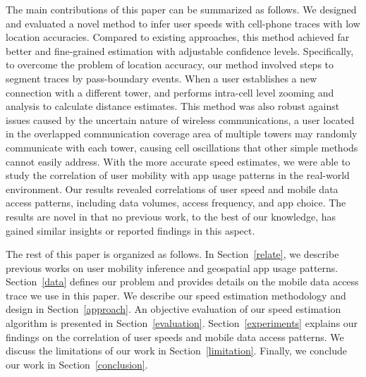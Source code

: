The main contributions of this paper can be summarized as follows.
We designed and evaluated a novel method to infer user speeds with cell-phone traces with low location accuracies. Compared to existing approaches, this method achieved far better and fine-grained estimation with adjustable confidence levels. Specifically, to overcome the problem of location accuracy, our method involved steps to segment traces by pass-boundary events. When a user establishes a new connection with a different tower, and performs intra-cell level zooming and analysis to calculate distance estimates. This method was also robust against issues caused by the uncertain nature of wireless communications, \eg a user located in the overlapped communication coverage area of multiple towers may randomly communicate with each tower, causing cell oscillations that other simple methods cannot easily address.
With the more accurate speed estimates, we were able to study the correlation of user mobility with app usage patterns in the real-world environment. 
Our results revealed correlations of user speed and mobile data access patterns, including data volumes, access frequency, 
and app choice. 
The results are novel in that no previous work, to the best of our knowledge, has gained similar insights or reported findings in this aspect.

The rest of this paper is organized as follows.
In Section~\ref{relate}, we describe previous works on user mobility inference and geospatial app usage patterns.
Section~\ref{data} defines our problem and provides details on the mobile data access trace we use in this paper.
We describe our speed estimation methodology and design in Section~\ref{approach}.
An objective evaluation of our speed estimation algorithm is presented in Section~\ref{evaluation}.
Section~\ref{experiments} explains our findings on the correlation of user speeds and mobile data access patterns.
We discuss the limitations of our work in Section~\ref{limitation}.
Finally, we conclude our work in Section~\ref{conclusion}.




